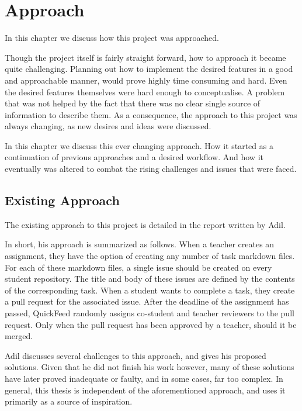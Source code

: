 
\chapter{Approach}
\label{ch:approach}

In this chapter we discuss how this project was approached.

Though the project itself is fairly straight forward, how to approach it became quite challenging.
Planning out how to implement the desired features in a good and approachable manner, would prove highly time consuming and hard.
Even the desired features themselves were hard enough to conceptualise.
A problem that was not helped by the fact that there was no clear single source of information to describe them.
As a consequence, the approach to this project was always changing, as new desires and ideas were discussed.

In this chapter we discuss this ever changing approach.
How it started as a continuation of previous approaches and a desired workflow.
And how it eventually was altered to combat the rising challenges and issues that were faced.
 
\section{Existing Approach}

The existing approach to this project is detailed in the report written by Adil.

In short, his approach is summarized as follows.
When a teacher creates an assignment, they have the option of creating any number of task markdown files.
For each of these markdown files, a single issue should be created on every student repository.
The title and body of these issues are defined by the contents of the corresponding task.
When a student wants to complete a task, they create a pull request for the associated issue.
After the deadline of the assignment has passed, QuickFeed randomly assigns co-student and teacher reviewers to the pull request. 
Only when the pull request has been approved by a teacher, should it be merged.

Adil discusses several challenges to this approach, and gives his proposed solutions.
Given that he did not finish his work however, many of these solutions have later proved inadequate or faulty, and in some cases, far too complex.
In general, this thesis is independent of the aforementioned approach, and uses it primarily as a source of inspiration.


